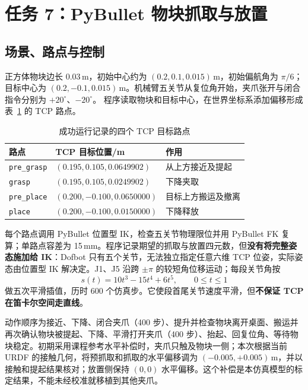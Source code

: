 \documentclass[12pt,a4paper,UTF8]{ctexart}
\begin{document}
\section{任务 7：PyBullet 物块抓取与放置}
\subsection{场景、路点与控制}
正方体物块边长 0.03\,m，初始中心约为 $(0.2,0.1,0.015)$\,m，初始偏航角为 $\pi/6$；目标中心为 $(0.2,-0.1,0.015)$\,m。机械臂五关节从复位角开始，夹爪张开与闭合指令分别为 $+20^\circ$、$-20^\circ$。
程序读取物块和目标中心，在世界坐标系添加偏移形成表~\ref{tab:waypoints} 的 TCP 路点。
\begin{table}[!htbp]
\centering\small
\caption{成功运行记录的四个 TCP 目标路点}\label{tab:waypoints}
\begin{tabular}{@{}lll@{}}
\toprule
路点 & TCP 目标位置/m & 作用\\ \midrule
\texttt{pre\_grasp} & $(0.195,0.105,0.0649902)$ & 从上方接近及提起\\
\texttt{grasp} & $(0.195,0.105,0.0249902)$ & 下降夹取\\
\texttt{pre\_place} & $(0.200,-0.100,0.0650000)$ & 目标上方搬运及撤离\\
\texttt{place} & $(0.200,-0.100,0.0150000)$ & 下降释放\\ \bottomrule
\end{tabular}
\end{table}
每个路点调用 PyBullet 位置型 IK，检查五关节物理限位并用 PyBullet FK 复算；单路点容差为 15\,mm。程序记录期望的抓取与放置四元数，但\textbf{没有将完整姿态施加给 IK}：Dofbot 只有五个关节，无法独立指定任意六维 TCP 位姿，实际姿态由位置型 IK 解决定。J1、J5 沿跨 $\pm\pi$ 的较短角位移运动；每段关节角按
\begin{equation}
s(t)=10t^3-15t^4+6t^5,\qquad 0\leq t\leq1
\end{equation}
做五次平滑插值，历时 600 个仿真步。它使段首尾关节速度平滑，但\textbf{不保证 TCP 在笛卡尔空间走直线}。

动作顺序为接近、下降、闭合夹爪（400 步）、提升并检查物块离开桌面、搬运并再次确认物块被提起、下降、平滑打开夹爪（400 步）、抬起、回复位角、等待物块稳定。初期采用课程参考水平补偿时，夹爪只触及物块一侧；本次根据当前 URDF 的接触几何，将预抓取和抓取的水平偏移调为 $(-0.005,+0.005)$\,m，并以接触和提起结果核对；放置侧保持 $(0,0)$ 水平偏移。这个补偿是本仿真模型的标定结果，不能未经校准就移植到其他夹爪。
\end{document}
